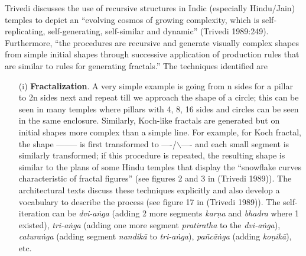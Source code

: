 Trivedi discusses the use of recursive structures in Indic (especially Hindu/Jain) temples to depict an “evolving cosmos of growing complexity, which is self-replicating, self-generating, self-similar and dynamic” (Trivedi 1989:249). Furthermore, “the procedures are recursive and generate visually complex shapes from simple initial shapes through successive application of production rules that are similar to rules for generating fractals.” The techniques identified are 
\begin{itemize}
\item[(i)] \textbf{Fractalization}. A very simple example is going from n sides for a pillar to 2n sides next and repeat till we approach the shape of a circle; this can be seen in many temples where pillars with 4, 8, 16 sides and circles can be seen in the same enclosure. Similarly, Koch-like fractals are generated but on initial shapes more complex than a simple line. For example, for Koch fractal, the shape -------- is first transformed to ----/$\backslash$---- and each small segment is similarly transformed; if this procedure is repeated, the resulting shape is similar to the plans of some Hindu temples that display the “snowflake curves characteristic of fractal figures” (see figures 2 and 3 in (Trivedi 1989)). The architectural texts discuss these techniques explicitly and also develop a vocabulary to describe the process (see figure 17 in (Trivedi 1989)). The self-iteration can be \textsl{dvi-aṅga} (adding 2 more segments \textsl{karṇa} and \textsl{bhadra} where 1 existed), \textsl{tri-aṅga} (adding one more segment \textsl{pratiratha} to the \textsl{dvi-aṅga}), \textsl{caturaṅga} (adding segment \textsl{nandikā} to \textsl{tri-aṅga}), \textsl{pañcāṅga} (adding \textsl{koṇikā}), etc. 


\end{itemize}
